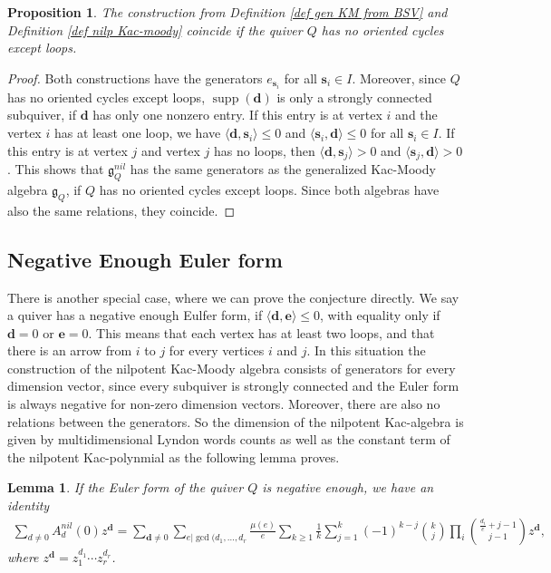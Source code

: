\documentclass{article}
\newcommand{\bs}{\mathbf{s}}
\newcommand{\bd}{\mathbf{d}}
\newcommand{\be}{\mathbf{e}}
\DeclareMathOperator{\supp}{supp}
\newtheorem{lemma}[theorem]{Lemma}
\newtheorem{proposition}[theorem]{Proposition}
\begin{document}
\begin{proposition}
    The construction from Definition \ref{def gen KM from BSV} and Definition \ref{def nilp Kac-moody} coincide if the quiver $Q$ has no oriented cycles except loops.
\end{proposition}
\begin{proof}
    Both constructions have the generators $e_{\bs_i}$ for all $\bs_i \in I$. Moreover, since $Q$ has no oriented cycles except loops, $\supp(\bd)$ is only a strongly connected subquiver, if $\bd$ has only one nonzero entry. If this entry is at vertex $i$ and the vertex $i$ has at least one loop, we have $\langle \bd, \bs_i \rangle \leq 0$ and $\langle \bs_i, \bd \rangle \leq 0$ for all $\bs_i \in I$. If this entry is at vertex $j$ and vertex $j$ has no loops, then $\langle \bd, \bs_j \rangle > 0$ and $\langle \bs_j, \bd \rangle > 0$. This shows that $\mathfrak{g}_Q^{nil}$ has the same generators as the generalized Kac-Moody algebra $\mathfrak{g}_Q$, if $Q$ has no oriented cycles except loops. Since both algebras have also the same relations, they coincide.
\end{proof}

\subsection{Negative Enough Euler form}
 There is another special case, where we can prove the conjecture directly. We say a quiver has a negative enough Eulfer form, if $\langle \bd, \be \rangle \leq 0$, with equality only if $\bd=0$ or $\be=0.$ This means that each vertex has at least two loops, and that there is an arrow from $i$ to $j$ for every vertices $i$ and $j$. In this situation the construction of the nilpotent Kac-Moody algebra consists of generators for every dimension vector, since every subquiver is strongly connected and the Euler form is always negative for non-zero dimension vectors. Moreover, there are also no relations between the generators. So the dimension of the nilpotent Kac-algebra is given by multidimensional Lyndon words counts as well as the constant term of the nilpotent Kac-polynmial as the following lemma proves.

 \begin{lemma}
     If the Euler form of the quiver $Q$ is negative enough, we have an identity
     \begin{align*}
         \sum_{d \neq 0} A^{nil}_d(0) z^{\bd} =  \sum_{\bd \neq 0} \sum_{e | \gcd (d_1, \dots, d_r} \frac{\mu(e)}{e} \sum_{k \geq 1} \frac{1}{k} \sum^k_{j=1} (-1)^{k-j} \binom{k}{j} \prod_i \binom{\frac{d_i}{e}+j-1}{j-1} z^{\bd},
     \end{align*}
     where $z^{\bd} = z_1^{d_1} \cdots z_r^{d_r}$.
 \end{lemma}
\end{document}
